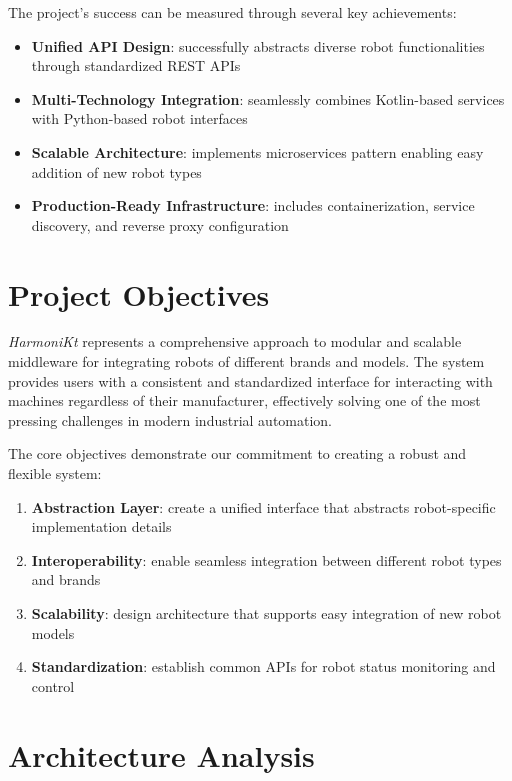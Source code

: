 \documentclass[runningheads]{llncs}
\newcommand{\thesystem}{\textit{HarmoniKt}\xspace}
\begin{document}
The project's success can be measured through several key achievements:

\begin{itemize}
    \item \textbf{Unified API Design}: successfully abstracts diverse robot functionalities through standardized REST APIs
    \item \textbf{Multi-Technology Integration}: seamlessly combines Kotlin-based services with Python-based robot interfaces
    \item \textbf{Scalable Architecture}: implements microservices pattern enabling easy addition of new robot types
    \item \textbf{Production-Ready Infrastructure}: includes containerization, service discovery, and reverse proxy configuration
\end{itemize}

%
%
%
\section{Project Objectives}

\thesystem represents a comprehensive approach to modular and scalable middleware for integrating robots of different brands and models. The system provides users with a consistent and standardized interface for interacting with machines regardless of their manufacturer, effectively solving one of the most pressing challenges in modern industrial automation.

The core objectives demonstrate our commitment to creating a robust and flexible system:

\begin{enumerate}
    \item \textbf{Abstraction Layer}: create a unified interface that abstracts robot-specific implementation details
    \item \textbf{Interoperability}: enable seamless integration between different robot types and brands
    \item \textbf{Scalability}: design architecture that supports easy integration of new robot models
    \item \textbf{Standardization}: establish common APIs for robot status monitoring and control
\end{enumerate}

%
%
%
\section{Architecture Analysis}
\end{document}
